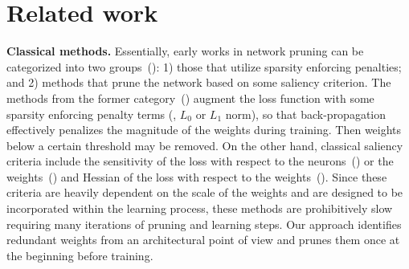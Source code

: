 \section{Related work}


\textbf{Classical methods.}\quad
Essentially, early works in network pruning can be categorized into two groups~(\cite{reed1993pruning}): 1) those that utilize sparsity enforcing penalties; and 2) methods that prune the network based on some saliency criterion. 
The methods from the former category~(\cite{chauvin1989back, weigend1991generalization, ishikawa1996structural}) augment the loss function with some sparsity enforcing penalty terms (\eg, $L_0$ or $L_1$ norm), so that back-propagation effectively penalizes the magnitude of the weights during training. 
Then weights below a certain threshold may be removed.
On the other hand, classical saliency criteria include the sensitivity of the loss with respect to the neurons~(\cite{NIPS1988_119}) or the weights~(\cite{karnin1990simple}) and Hessian of the loss with respect to the weights~(\cite{lecun1990optimal, hassibi1993optimal}).
Since these criteria are heavily dependent on the scale of the weights and are designed to be incorporated within the learning process, these methods are prohibitively slow requiring many iterations of pruning and learning steps.
Our approach identifies redundant weights from an architectural point of view and prunes them once at the beginning before training.

